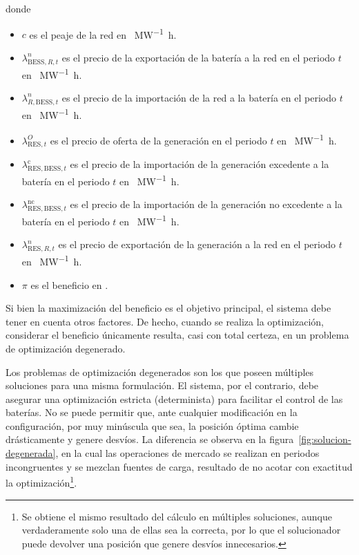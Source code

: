 donde

\begin{itemize}

  \item \( c \) es el peaje de la red en \si{\text{\euro}\per\mega\watt\hour}.

  \item \( \lambda^{n}_{\text{BESS}, R, t} \) es el precio de la exportación de la batería a la red en el periodo \( t \) en \si{\text{\euro}\per\mega\watt\hour}.

  \item \( \lambda^{n}_{R, \text{BESS}, t}\) es el precio de la importación de la red a la batería en el periodo \( t \) en \si{\text{\euro}\per\mega\watt\hour}.

  \item \( \lambda^{O}_{\text{RES}, t} \) es el precio de oferta de la generación en el periodo \( t \) en \si{\text{\euro}\per\mega\watt\hour}.

  \item \( \lambda^{\text{c}}_{\text{RES}, \text{BESS}, t} \) es el precio de la importación de la generación excedente a la batería en el periodo \( t \) en \si{\text{\euro}\per\mega\watt\hour}.

  \item \( \lambda^{\text{nc}}_{\text{RES}, \text{BESS}, t} \) es el precio de la importación de la generación no excedente a la batería en el periodo \( t \) en \si{\text{\euro}\per\mega\watt\hour}.

  \item \( \lambda^{n}_{\text{RES}, R, t} \) es el precio de exportación de la generación a la red en el periodo \( t \) en \si{\text{\euro}\per\mega\watt\hour}.

  \item \( \pi \) es el beneficio en \si{\text{\euro}}.

\end{itemize}

Si bien la maximización del beneficio es el objetivo principal, el sistema debe tener en cuenta otros factores. De hecho, cuando se realiza la optimización, considerar el beneficio únicamente resulta, casi con total certeza, en un problema de optimización degenerado.

Los problemas de optimización degenerados son los que poseen múltiples soluciones para una misma formulación. El sistema, por el contrario, debe asegurar una optimización estricta (determinista) para facilitar el control de las baterías. No se puede permitir que, ante cualquier modificación en la configuración, por muy minúscula que sea, la posición óptima cambie drásticamente y genere desvíos. La diferencia se observa en la figura~\ref{fig:solucion-degenerada}, en la cual las operaciones de mercado se realizan en periodos incongruentes y se mezclan fuentes de carga, resultado de no acotar con exactitud la optimización\footnote{Se obtiene el mismo resultado del cálculo en múltiples soluciones, aunque verdaderamente solo una de ellas sea la correcta, por lo que el solucionador puede devolver una posición que genere desvíos innecesarios.}.

